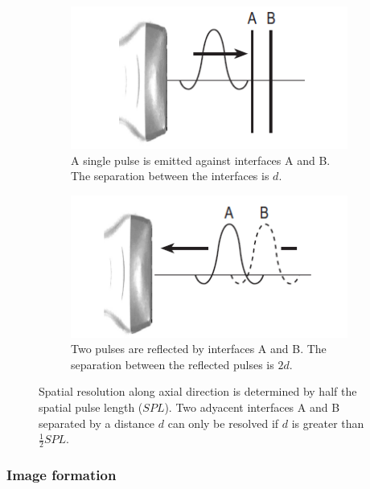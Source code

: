 \documentclass[12pt]{article} %
\begin{document}
\begin{figure}
\centering
\begin{subfigure}[b]{0.4\textwidth}
\centering
\includegraphics[width=\textwidth]{figuras/resolution1_edit.png}
\caption{\footnotesize A single pulse is emitted against interfaces A and B. The separation between the interfaces is $d$.}
\end{subfigure}
\centering
\hspace{3em}
\begin{subfigure}[b]{0.4\textwidth}
\centering
\includegraphics[width=\textwidth]{figuras/resolution2_edit.png}
\caption{\footnotesize Two pulses are reflected by interfaces A and B. The separation between the reflected pulses is $2d$.}
\end{subfigure}	
\caption{\small Spatial resolution along axial direction is determined by half the spatial pulse length ($SPL$). Two adyacent interfaces A and B separated by a distance $d$ can only be resolved if $d$ is greater than $\frac{1}{2} SPL$. \cite{farr}}
\label{resolution}
\end{figure}


\subsubsection{Image formation}
	
\end{document}

